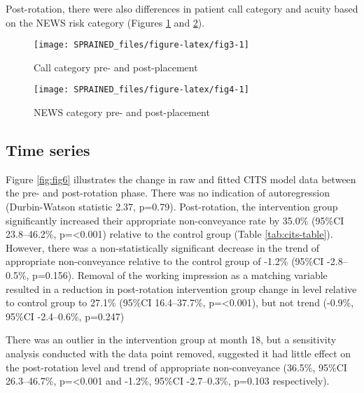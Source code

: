\documentclass[
  a4paper,
  openany]{article}
\begin{document}
Post-rotation, there were also differences in patient call category and acuity based on the NEWS risk category (Figures \ref{fig:fig3} and \ref{fig:fig4}).

\begin{figure}

{\centering \texttt{[image: SPRAINED\_files/figure-latex/fig3-1]} 

}

\caption{Call category pre- and post-placement}\label{fig:fig3}
\end{figure}

\begin{figure}[p]

{\centering \texttt{[image: SPRAINED\_files/figure-latex/fig4-1]} 

}

\caption{NEWS category pre- and post-placement}\label{fig:fig4}
\end{figure}

\hypertarget{time-series}{%
\subsection*{Time series}\label{time-series}}

Figure \ref{fig:fig6} illustrates the change in raw and fitted CITS model data between the pre- and post-rotation phase. There was no indication of autoregression (Durbin-Watson statistic 2.37, p=0.79). Post-rotation, the intervention group significantly increased their appropriate non-conveyance rate by 35.0\% (95\%CI 23.8--46.2\%, p=\textless0.001) relative to the control group (Table \ref{tab:cits-table}). However, there was a non-statistically significant decrease in the trend of appropriate non-conveyance relative to the control group of -1.2\% (95\%CI -2.8--0.5\%, p=0.156). Removal of the working impression as a matching variable resulted in a reduction in post-rotation intervention group change in level relative to control group to 27.1\% (95\%CI 16.4--37.7\%, p=\textless0.001), but not trend (-0.9\%, 95\%CI -2.4--0.6\%, p=0.247)

There was an outlier in the intervention group at month 18, but a sensitivity analysis conducted with the data point removed, suggested it had little effect on the post-rotation level and trend of appropriate non-conveyance (36.5\%, 95\%CI 26.3--46.7\%, p=\textless0.001 and -1.2\%, 95\%CI -2.7--0.3\%, p=0.103 respectively).
\end{document}

